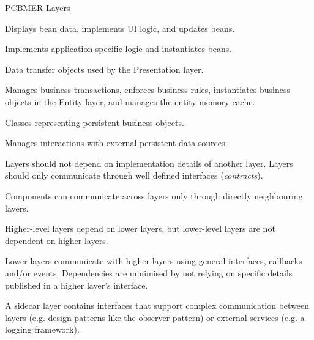 \documentclass{slide}
\begin{document}
\begin{frame}{PCBMER Layers}

\large{
\begin{description}[<+->]
    \item[Presentation] Displays bean data, implements UI logic, and updates beans.
    \item[Controller] Implements application specific logic and instantiates beans.
    \item[Bean] Data transfer objects used by the Presentation layer.
    \item[Mediator] Manages business transactions, enforces business rules, instantiates business objects in the Entity layer, and manages the entity memory cache.
    \item[Entity] Classes representing persistent business objects.
    \item[Resource] Manages interactions with external persistent data sources.
\end{description}
}

\end{frame}


{Layers should not depend on implementation details of another layer.
Layers should only communicate through well defined interfaces (\emph{contracts}).}

{Components can communicate across layers only through directly neighbouring layers.}

{Higher-level layers depend on lower layers, but lower-level layers are not dependent on higher layers.}

{Lower layers communicate with higher layers using general interfaces, callbacks and/or events.
Dependencies are minimised by not relying on specific details published in a higher layer’s interface.}

{A sidecar layer contains interfaces that support complex communication between layers
(e.g. design patterns like the observer pattern) or external services (e.g. a logging framework).}



\end{document}
